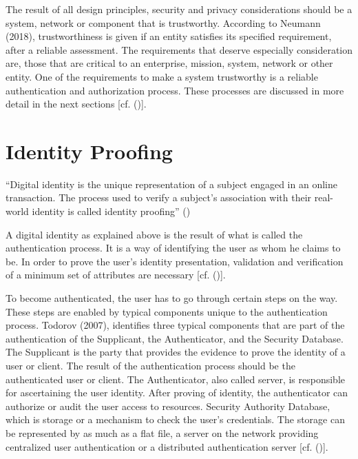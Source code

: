 The result of all design principles, security and privacy considerations should be a system, network or component that is trustworthy. According to Neumann (2018), trustworthiness is given if an entity satisfies its specified requirement, after a reliable assessment. The requirements that deserve especially consideration are, those that are critical to an enterprise, mission, system, network or other entity. One of the requirements to make a system trustworthy is a reliable authentication and authorization process. These processes are discussed in more detail in the next sections [cf. (\cite{Neumann:2018:PTC})].



\section{Identity Proofing}
\label{identityProofing}

“Digital identity is the unique representation of a subject engaged in an online transaction. The process used to verify a subject’s association with their real-world identity is called identity proofing” (\cite{NIST:2017:DIG})

A digital identity as explained above is the result of what is called the authentication process. It is a way of identifying the user as whom he claims to be. In order to prove the user's identity presentation, validation and verification of a minimum set of attributes are necessary [cf. (\cite{Boyd:2012:GSOAuth})]. 

To become authenticated, the user has to go through certain steps on the way. These steps are enabled by typical components unique to the authentication process. Todorov (2007), identifies three typical components that are part of the authentication of the Supplicant, the Authenticator, and the Security Database. The Supplicant is the party that provides the evidence to prove the identity of a user or client. The result of the authentication process should be the authenticated user or client. The Authenticator, also called server, is responsible for ascertaining the user identity. After proving of identity, the authenticator can authorize or audit the user access to resources. Security Authority Database, which is storage or a mechanism to check the user's credentials. The storage can be represented by as much as a flat file, a server on the network providing centralized user authentication or a distributed authentication server [cf. (\cite{Todorov:2007:MUI})]. 



